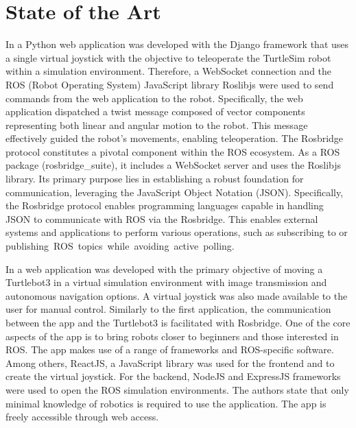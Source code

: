 \documentclass[conference]{IEEEtran}
\begin{document}
\section{State of the Art}
In \cite{kapic} a Python web application was developed with the Django framework that uses a single virtual joystick with the objective to teleoperate the TurtleSim robot within a simulation environment. 
Therefore, a WebSocket connection and the ROS (Robot Operating System) \cite{rosbridgeOkState} JavaScript library Roslibjs were used to send commands from the web application to the robot. Specifically, the web application dispatched a twist message composed of vector components representing both linear and angular motion to the robot. This message effectively guided the robot's movements, enabling teleoperation.
The Rosbridge protocol constitutes a pivotal component within the ROS ecosystem. As a ROS package (rosbridge\_suite), it includes a WebSocket server and uses the Roslibjs library. Its primary purpose lies in establishing a robust foundation for communication, leveraging the JavaScript Object Notation (JSON).
Specifically, the Rosbridge protocol enables programming languages capable in handling JSON to communicate with ROS via the Rosbridge. 
This enables external systems and applications to perform various operations, such as subscribing to or \mbox{publishing ROS topics while avoiding active polling. \cite{rosbridgeOkState,rosbridgeSuite}}

In \cite{dinodi} a web application was developed with the primary objective of moving a Turtlebot3 in a virtual simulation environment with image transmission and autonomous navigation options. A virtual joystick was also made available to the user for manual control. Similarly to the first application, the communication between the app and the Turtlebot3 is facilitated with Rosbridge. 
One of the core aspects of the app is to bring robots closer to beginners and those interested in ROS. 
The app makes use of a range of frameworks and ROS-specific software. Among others, ReactJS, a JavaScript library was used for the frontend and to create the virtual joystick. For the backend, NodeJS and ExpressJS frameworks were used to open the ROS simulation environments. 
The authors state that only minimal knowledge of robotics is required to use the application. The app is freely accessible  through web access.
\end{document}
